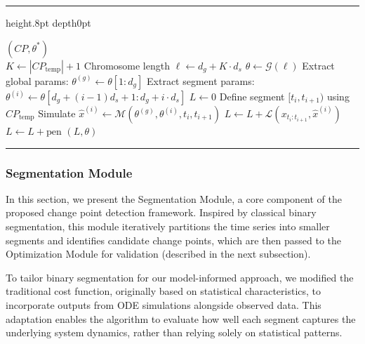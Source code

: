 \documentclass[10pt,letterpaper]{article}
\newenvironment{breakablealgorithm}
  {\begin{center}
     \refstepcounter{algorithm}
     \hrule height.8pt depth0pt \kern2pt
     \renewcommand{\caption}[2][\relax]{%
       {\raggedright\textbf{Algorithm~\thealgorithm} ##2\par}%
       \kern2pt\hrule\kern2pt
     }
  }
  {\kern2pt\hrule\relax
   \end{center}
  }
\begin{document}
\begin{breakablealgorithm}
\begin{algorithmic}[1]
    \State \Return $(CP, \theta^*)$
\EndProcedure
\\
 
    \State $K \gets |CP_{\text{temp}}| + 1$
    \State Chromosome length $\ell \gets d_g + K \cdot d_s$
    \State $\theta \gets \mathcal{G}(\ell)$ 
    \State Extract global params: $\theta^{(g)} \gets \theta[1:d_g]$
    \State Extract segment params: $\theta^{(i)} \gets \theta[d_g + (i-1)d_s + 1 : d_g + i \cdot d_s]$
    \State $L \gets 0$
        \State Define segment $[t_i, t_{i+1})$ using $CP_{\text{temp}}$
        \State Simulate $\hat{x}^{(i)} \gets \mathcal{M}(\theta^{(g)}, \theta^{(i)}, t_i, t_{i+1})$
        \State $L \gets L + \mathcal{L}(x_{t_i:t_{i+1}}, \hat{x}^{(i)})$ 
    \EndFor
    \State $L \gets L + \mathrm{pen}$ 
    \State \Return $(L, \theta)$
\EndProcedure

\end{algorithmic}
\end{breakablealgorithm}



\subsubsection*{Segmentation Module}
In this section, we present the Segmentation Module, a core component of the proposed change point detection framework. Inspired by classical binary segmentation, this module iteratively partitions the time series into smaller segments and identifies candidate change points, which are then passed to the Optimization Module for validation (described in the next subsection).

To tailor binary segmentation for our model-informed approach, we modified the traditional cost function, originally based on statistical characteristics, to incorporate outputs from ODE simulations alongside observed data. This adaptation enables the algorithm to evaluate how well each segment captures the underlying system dynamics, rather than relying solely on statistical patterns.
\end{document}
